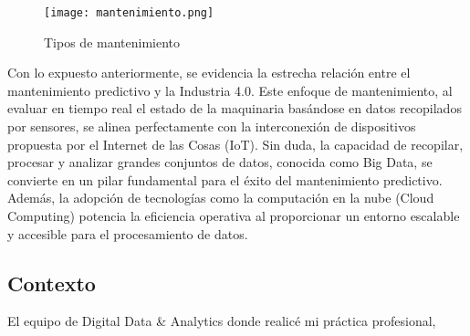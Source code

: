 \documentclass{article}
\begin{document}
\begin{center}
\begin{figure}[h]
  \centering
  \texttt{[image: mantenimiento.png]}
  \caption{Tipos de mantenimiento}
\end{figure}    
\end{center}

Con lo expuesto anteriormente, se evidencia la estrecha relación entre el mantenimiento predictivo y la Industria 4.0. Este enfoque de mantenimiento, al evaluar en tiempo real el estado de la maquinaria basándose en datos recopilados por sensores, se alinea perfectamente con la interconexión de dispositivos propuesta por el Internet de las Cosas (IoT). Sin duda, la capacidad de recopilar, procesar y analizar grandes conjuntos de datos, conocida como Big Data, se convierte en un pilar fundamental para el éxito del mantenimiento predictivo. Además, la adopción de tecnologías como la computación en la nube (Cloud Computing) potencia la eficiencia operativa al proporcionar un entorno escalable y accesible para el procesamiento de datos.

\subsection{Contexto}

El equipo de Digital Data \& Analytics donde realicé mi práctica profesional,
\end{document}
